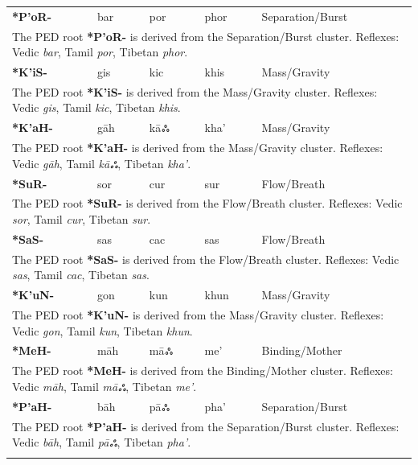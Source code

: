 \begin{longtable}{p{} p{} p{} p{} p{}}
\textbf{*P'oR-} & bar & por & phor & Separation/Burst \\ 
\multicolumn{5}{p{\textwidth}}{\small The PED root \textbf{*P'oR-} is derived from the Separation/Burst cluster. Reflexes: Vedic \textit{bar}, Tamil \textit{por}, Tibetan \textit{phor}. } \\ \addlinespace 
\textbf{*K'iS-} & gis & kic & khis & Mass/Gravity \\ 
\multicolumn{5}{p{\textwidth}}{\small The PED root \textbf{*K'iS-} is derived from the Mass/Gravity cluster. Reflexes: Vedic \textit{gis}, Tamil \textit{kic}, Tibetan \textit{khis}. } \\ \addlinespace 
\textbf{*K'aH-} & gāh & kāஃ & kha' & Mass/Gravity \\ 
\multicolumn{5}{p{\textwidth}}{\small The PED root \textbf{*K'aH-} is derived from the Mass/Gravity cluster. Reflexes: Vedic \textit{gāh}, Tamil \textit{kāஃ}, Tibetan \textit{kha'}. } \\ \addlinespace 
\textbf{*SuR-} & sor & cur & sur & Flow/Breath \\ 
\multicolumn{5}{p{\textwidth}}{\small The PED root \textbf{*SuR-} is derived from the Flow/Breath cluster. Reflexes: Vedic \textit{sor}, Tamil \textit{cur}, Tibetan \textit{sur}. } \\ \addlinespace 
\textbf{*SaS-} & sas & cac & sas & Flow/Breath \\ 
\multicolumn{5}{p{\textwidth}}{\small The PED root \textbf{*SaS-} is derived from the Flow/Breath cluster. Reflexes: Vedic \textit{sas}, Tamil \textit{cac}, Tibetan \textit{sas}. } \\ \addlinespace 
\textbf{*K'uN-} & gon & kun & khun & Mass/Gravity \\ 
\multicolumn{5}{p{\textwidth}}{\small The PED root \textbf{*K'uN-} is derived from the Mass/Gravity cluster. Reflexes: Vedic \textit{gon}, Tamil \textit{kun}, Tibetan \textit{khun}. } \\ \addlinespace 
\textbf{*MeH-} & māh & māஃ & me' & Binding/Mother \\ 
\multicolumn{5}{p{\textwidth}}{\small The PED root \textbf{*MeH-} is derived from the Binding/Mother cluster. Reflexes: Vedic \textit{māh}, Tamil \textit{māஃ}, Tibetan \textit{me'}. } \\ \addlinespace 
\textbf{*P'aH-} & bāh & pāஃ & pha' & Separation/Burst \\ 
\multicolumn{5}{p{\textwidth}}{\small The PED root \textbf{*P'aH-} is derived from the Separation/Burst cluster. Reflexes: Vedic \textit{bāh}, Tamil \textit{pāஃ}, Tibetan \textit{pha'}. } \\ \addlinespace 

\end{longtable}
